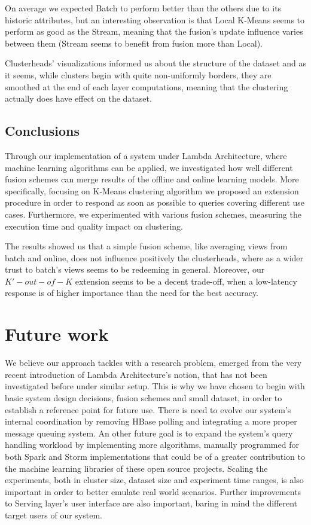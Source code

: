 \documentclass{lmproj}
\begin{document}
On average we expected Batch to perform better than the others due to its historic attributes, but an interesting observation is that Local K-Means seems to perform as good as the Stream, meaning that the fusion's update influence varies between them (Stream seems to benefit from fusion more than Local).

Clusterheads' visualizations informed us about the structure of the dataset and as it seems, while clusters begin with quite non-uniformly borders, they are smoothed at the end of each layer computations, meaning that the clustering actually does have effect on the dataset. 

\section{Conclusions}
\label{conclusions}

Through our implementation of a system under Lambda Architecture, where machine learning algorithms can be applied, we investigated how well different fusion schemes can merge results of the offline and online learning models. More specifically, focusing on K-Means clustering algorithm we proposed an extension procedure in order to respond as soon as possible to queries covering different use cases. Furthermore, we experimented with various fusion schemes, measuring the execution time and quality impact on clustering. 

The results showed us that a simple fusion scheme, like averaging views from batch and online, does not influence positively the clusterheads, where as a wider trust to batch's views seems to be redeeming in general. Moreover, our $K'-out-of-K$ extension seems to be a decent trade-off, when a low-latency response is of higher importance than the need for the best accuracy.



\chapter{Future work}
\label{future_work}

We believe our approach tackles with a research problem, emerged from the very recent introduction of Lambda Architecture's notion, that has not been investigated before under similar setup. This is why we have chosen to begin with basic system design decisions, fusion schemes and small dataset, in order to establish a reference point for future use. There is need to evolve our system's internal coordination by removing HBase polling and integrating a more proper message queuing system. An other future goal is to expand the system's query handling workload by implementing more algorithms, manually programmed for both Spark and Storm implementations that could be of a greater contribution to the machine learning libraries of these open source projects. Scaling the experiments, both in cluster size, dataset size and experiment time ranges, is also important in order to better emulate real world scenarios. Further improvements to Serving layer's user interface are also important, baring in mind the different target users of our system.




\nocite{*}
\end{document}
